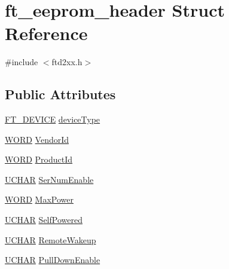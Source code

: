 \hypertarget{structft__eeprom__header}{}\section{ft\+\_\+eeprom\+\_\+header Struct Reference}
\label{structft__eeprom__header}


{\ttfamily \#include $<$ftd2xx.\+h$>$}

\subsection*{Public Attributes}
\begin{DoxyCompactItemize}
\item 
\hyperlink{LALUsbMLx64_2include_2ftd2xx_8h_a93f97052222c089b780302ff9c175cb6}{F\+T\+\_\+\+D\+E\+V\+I\+CE} \hyperlink{structft__eeprom__header_a3b27d86c243b51e47e6c279f0ef56251}{device\+Type}
\item 
\hyperlink{CatCaloProto40MHz_2inc_2WinTypes_8h_a197942eefa7db30960ae396d68339b97}{W\+O\+RD} \hyperlink{structft__eeprom__header_a63538171dfe221e65f0bd27938239c30}{Vendor\+Id}
\item 
\hyperlink{CatCaloProto40MHz_2inc_2WinTypes_8h_a197942eefa7db30960ae396d68339b97}{W\+O\+RD} \hyperlink{structft__eeprom__header_a342079ae92d0b71e0e71bde526ded445}{Product\+Id}
\item 
\hyperlink{CatCaloProto40MHz_2inc_2WinTypes_8h_a4f4bb67531a9bf6f0b9c6ad76aeba587}{U\+C\+H\+AR} \hyperlink{structft__eeprom__header_a04737398a9c4f758975303df5f0430e6}{Ser\+Num\+Enable}
\item 
\hyperlink{CatCaloProto40MHz_2inc_2WinTypes_8h_a197942eefa7db30960ae396d68339b97}{W\+O\+RD} \hyperlink{structft__eeprom__header_a28ce835ee57a5f21794798f64022d89b}{Max\+Power}
\item 
\hyperlink{CatCaloProto40MHz_2inc_2WinTypes_8h_a4f4bb67531a9bf6f0b9c6ad76aeba587}{U\+C\+H\+AR} \hyperlink{structft__eeprom__header_a98fe9504d952d4d579dd8d047a70d175}{Self\+Powered}
\item 
\hyperlink{CatCaloProto40MHz_2inc_2WinTypes_8h_a4f4bb67531a9bf6f0b9c6ad76aeba587}{U\+C\+H\+AR} \hyperlink{structft__eeprom__header_a923b8578325e21645cc18b54784966f4}{Remote\+Wakeup}
\item 
\hyperlink{CatCaloProto40MHz_2inc_2WinTypes_8h_a4f4bb67531a9bf6f0b9c6ad76aeba587}{U\+C\+H\+AR} \hyperlink{structft__eeprom__header_a3a9b620423c2d0d1f452269c255f4209}{Pull\+Down\+Enable}
\end{DoxyCompactItemize}


